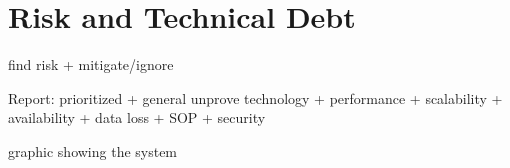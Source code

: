 \section{Risk and Technical Debt}

find risk + mitigate/ignore

Report: prioritized + general
unprove technology + performance + scalability + availability + data loss + SOP + security

graphic showing the system

